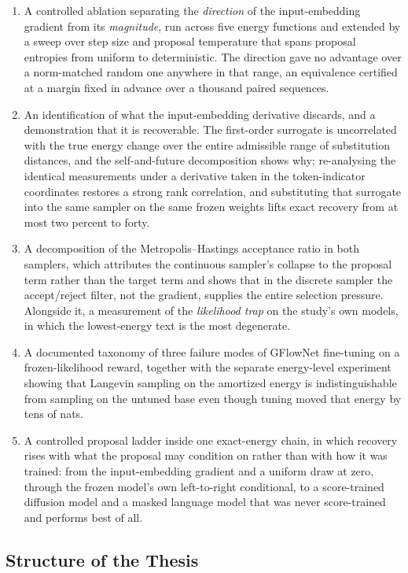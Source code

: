 \begin{enumerate}
    \item A controlled ablation separating the \emph{direction} of the input-embedding gradient from its \emph{magnitude}, run across five energy functions and extended by a sweep over step size and proposal temperature that spans proposal entropies from uniform to deterministic. The direction gave no advantage over a norm-matched random one anywhere in that range, an equivalence certified at a margin fixed in advance over a thousand paired sequences.
    \item An identification of what the input-embedding derivative discards, and a demonstration that it is recoverable. The first-order surrogate is uncorrelated with the true energy change over the entire admissible range of substitution distances, and the self-and-future decomposition shows why; re-analysing the identical measurements under a derivative taken in the token-indicator coordinates restores a strong rank correlation, and substituting that surrogate into the same sampler on the same frozen weights lifts exact recovery from at most two percent to forty.
    \item A decomposition of the Metropolis--Hastings acceptance ratio in both samplers, which attributes the continuous sampler's collapse to the proposal term rather than the target term and shows that in the discrete sampler the accept/reject filter, not the gradient, supplies the entire selection pressure. Alongside it, a measurement of the \emph{likelihood trap} on the study's own models, in which the lowest-energy text is the most degenerate.
    \item A documented taxonomy of three failure modes of GFlowNet fine-tuning on a frozen-likelihood reward, together with the separate energy-level experiment showing that Langevin sampling on the amortized energy is indistinguishable from sampling on the untuned base even though tuning moved that energy by tens of nats.
    \item A controlled proposal ladder inside one exact-energy chain, in which recovery rises with what the proposal may condition on rather than with how it was trained: from the input-embedding gradient and a uniform draw at zero, through the frozen model's own left-to-right conditional, to a score-trained diffusion model and a masked language model that was never score-trained and performs best of all.
\end{enumerate}

\subsection{Structure of the Thesis}
\label{sec:intro-structure}

